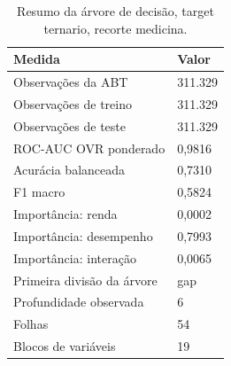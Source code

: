 \begin{table}
\caption{Resumo da árvore de decisão, target ternario, recorte medicina.}
\label{tab:tabela_treeClassification_ternario_recorte_medicina_principal_in_sample_e5}
\begin{tabular}{ll}
\toprule
Medida & Valor \\
\midrule
Observações da ABT & 311.329 \\
Observações de treino & 311.329 \\
Observações de teste & 311.329 \\
ROC-AUC OVR ponderado & 0,9816 \\
Acurácia balanceada & 0,7310 \\
F1 macro & 0,5824 \\
Importância: renda & 0,0002 \\
Importância: desempenho & 0,7993 \\
Importância: interação & 0,0065 \\
Primeira divisão da árvore & gap \\
Profundidade observada & 6 \\
Folhas & 54 \\
Blocos de variáveis & 19 \\
\bottomrule
\end{tabular}
\end{table}
